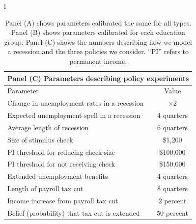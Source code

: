 \documentclass[\econtexRoot/EGMN]{subfiles}
\begin{document}
{\begin{table}[p]
\begin{center}
\begin{tabular}{l}
                \begin{tabular}{lc}
                    \toprule
                    \multicolumn{2}{l}{Panel (C) Parameters describing policy experiments} \\ \midrule
                    Parameter                                     & Value                  \\ \midrule
                    Change in unemployment rates in a recession   & $\times 2$             \\
                    Expected unemployment spell in a recession    & 4 quarters             \\
                    Average length of recession                   & 6 quarters             \\
                    Size of stimulus check                        & \$1,200                \\
                    PI threshold for reducing check size          & \$100,000              \\
                    PI threshold for not receiving check          & \$150,000              \\
                    Extended unemployment benefits                & 4 quarters             \\
                    Length of payroll tax cut                     & 8 quarters             \\
                    Income increase from payroll tax cut          & 2 percent              \\
                    Belief (probability) that tax cut is extended & 50 percent
                    \\ \bottomrule
                \end{tabular}
            \end{tabular}
        \end{center}
        \caption{Panel (A) shows parameters calibrated the same for all types. Panel (B) shows parameters calibrated for each education group. Panel (C) shows the numbers describing how we model a recession and the three policies we consider. ``PI'' refers to permanent income.}
        \notinsubfile{\label{tab:calibration}}
    \end{table}
    \clearpage
}
\end{document}
